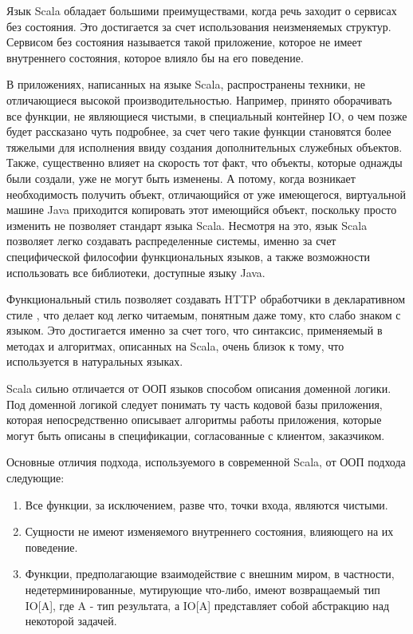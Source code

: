 \documentclass[14pt]{extarticle}
\begin{document}
    Язык Scala обладает большими преимуществами, когда речь заходит о сервисах без состояния. Это достигается за счет
    использования неизменяемых структур. Сервисом без состояния называется такой приложение, которое не имеет внутреннего состояния,
    которое влияло бы на его поведение.

    В приложениях, написанных на языке Scala, распространены
    техники, не отличающиеся высокой производительностью. Например, принято оборачивать все функции, не являющиеся
    чистыми, в специальный контейнер IO\cite{monad}, о чем позже будет рассказано чуть подробнее,
    за счет чего такие функции становятся более тяжелыми для исполнения ввиду создания дополнительных служебных объектов.
    Также, существенно влияет на
    скорость тот факт, что объекты, которые однажды были создали, уже не могут быть изменены. А потому, когда возникает
    необходимость получить объект, отличающийся от уже имеющегося, виртуальной машине Java приходится
    копировать этот имеющийся объект, поскольку просто изменить не позволяет стандарт языка Scala.
    Несмотря на это, язык Scala позволяет
    легко создавать распределенные
    системы, именно за счет
    специфической
    философии
    функциональных языков, а также возможности использовать все библиотеки, доступные языку Java.

    Функциональный стиль позволяет создавать HTTP обработчики в декларативном стиле \cite{decl}, что делает код
    легко
    читаемым, понятным даже тому, кто слабо знаком с языком. Это достигается именно за счет того, что синтаксис,
    применяемый в
    методах и
    алгоритмах, описанных на Scala, очень близок к тому, что используется в натуральных языках. \cite{declnat}

    Scala сильно отличается от ООП языков способом описания доменной логики. Под доменной логикой следует понимать
    ту часть кодовой базы приложения, которая непосредственно описывает алгоритмы работы приложения,
    которые могут быть описаны в спецификации,
    согласованные с клиентом, заказчиком.

    Основные отличия подхода, используемого в современной Scala, от ООП подхода следующие:
    \begin{enumerate}
        \item Все функции, за исключением, разве что, точки входа, являются чистыми.
        \item Сущности не имеют изменяемого внутреннего состояния, влияющего на их поведение.
        \item Функции, предполагающие взаимодействие с внешним миром, в частности, недетерминированные,
        мутирующие что-либо, имеют возвращаемый тип IO[A], где A - тип результата, а IO[A] представляет собой
        абстракцию над некоторой задачей.
    \end{enumerate}
\end{document}
